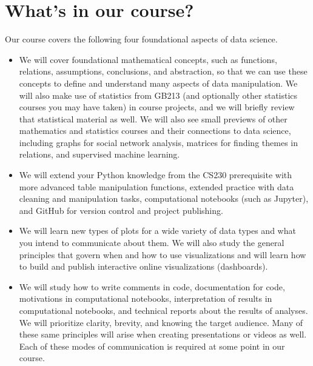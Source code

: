 \documentclass[letterpaper,10pt,english]{jupyterBook}
\begin{document}
\section{What’s in our course?}
\label{\detokenize{chapter-1-intro-to-data-science:what-s-in-our-course}}
\sphinxAtStartPar
Our course covers the following four foundational aspects of data science.
\begin{itemize}
\item {} 
\sphinxAtStartPar
{} We will cover foundational mathematical concepts, such as functions, relations, assumptions, conclusions, and abstraction, so that we can use these concepts to define and understand many aspects of data manipulation.  We will also make use of statistics from GB213 (and optionally other statistics courses you may have taken) in course projects, and we will briefly review that statistical material as well.  We will also see small previews of other mathematics and statistics courses and their connections to data science, including graphs for social network analysis, matrices for finding themes in relations, and supervised machine learning.

\item {} 
\sphinxAtStartPar
{} We will extend your Python knowledge from the CS230 prerequisite with more advanced table manipulation functions, extended practice with data cleaning and manipulation tasks, computational notebooks (such as Jupyter), and GitHub for version control and project publishing.

\item {} 
\sphinxAtStartPar
{} We will learn new types of plots for a wide variety of data types and what you intend to communicate about them.  We will also study the general principles that govern when and how to use visualizations and will learn how to build and publish interactive online visualizations (dashboards).

\item {} 
\sphinxAtStartPar
{} We will study how to write comments in code, documentation for code, motivations in computational notebooks, interpretation of results in computational notebooks, and technical reports about the results of analyses.  We will prioritize clarity, brevity, and knowing the target audience.  Many of these same principles will arise when creating presentations or videos as well.  Each of these modes of communication is required at some point in our course.

\end{itemize}
\end{document}
